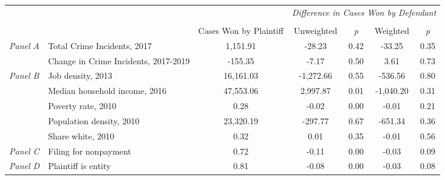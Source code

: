 \begin{tabular}{llccccc}
\toprule
 &  & \textit{} & \multicolumn{4}{c}{\textit{Difference in Cases Won by Defendant}} \\
\cline{4-7}
\\
 &  & Cases Won by Plaintiff & Unweighted & \emph{p} & Weighted & \emph{p} \\
\midrule
\multirow[c]{2}{.75cm}{\textit{Panel A}} & Total Crime Incidents, 2017 & 1,151.91 & -28.23 & 0.42 & -33.25 & 0.35 \\
 & Change in Crime Incidents, 2017-2019 & -155.35 & -7.17 & 0.50 & 3.61 & 0.73 \\
\cline{1-7}
\multirow[c]{5}{.75cm}{\textit{Panel B}} & Job density, 2013 & 16,161.03 & -1,272.66 & 0.55 & -536.56 & 0.80 \\
 & Median household income, 2016 & 47,553.06 & 2,997.87 & 0.01 & -1,040.20 & 0.31 \\
 & Poverty rate, 2010 & 0.28 & -0.02 & 0.00 & -0.01 & 0.21 \\
 & Population density, 2010 & 23,320.19 & -297.77 & 0.67 & -651.34 & 0.36 \\
 & Share white, 2010 & 0.32 & 0.01 & 0.35 & -0.01 & 0.56 \\
\cline{1-7}
\textit{Panel C} & Filing for nonpayment & 0.72 & -0.11 & 0.00 & -0.03 & 0.09 \\
\cline{1-7}
\textit{Panel D} & Plaintiff is entity & 0.81 & -0.08 & 0.00 & -0.03 & 0.08 \\
\cline{1-7}
\bottomrule
\end{tabular}
